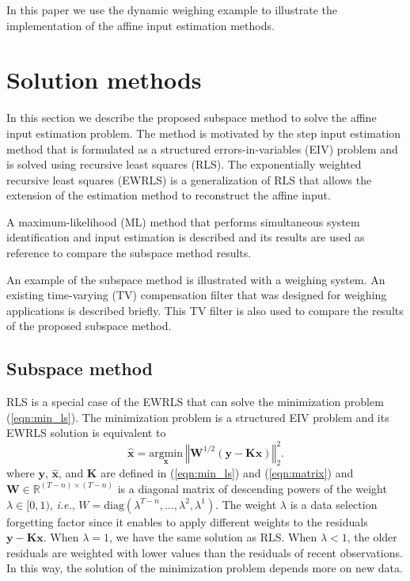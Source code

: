 In this paper we use the dynamic weighing example to illustrate the implementation of the affine input estimation methods.



\section{Solution methods}

In this section we describe the proposed subspace method to solve the affine input estimation problem.
The method is motivated by the step input estimation method that is formulated as a structured errors-in-variables (EIV) problem and is solved using recursive least squares (RLS).
The exponentially weighted recursive least squares (EWRLS) is a generalization of RLS that allows the extension of the estimation method to reconstruct the affine input.

A maximum-likelihood (ML) method that performs simultaneous system identification and input estimation is described and its results are used as reference to compare the subspace method results.

An example of the subspace method is illustrated with a weighing system.
An existing time-varying (TV) compensation filter that was designed for weighing applications is described briefly.
This TV filter is also used to compare the results of the proposed subspace method.


\subsection{Subspace method}

RLS is a special case of the EWRLS that can solve the minimization problem (\ref{eqn:min_ls}).
The minimization problem is a structured EIV problem and its EWRLS solution is equivalent to 
\begin{equation} \widehat{\mathbf{x}} = \underset{\mathbf{x}}{\mathrm{argmin}} \ \left\Vert \mathbf{W}^{1/2} \left( \mathbf{y} - \mathbf{K} \mathbf{x} \right) \right\Vert^2_2 . \label{eqn:min_ewrls} \end{equation}
where $\mathbf{y}$, $\widehat{\mathbf{x}}$, and $\mathbf{K}$ are defined in (\ref{eqn:min_ls}) and (\ref{eqn:matrix}) and
$\mathbf{W} \in \mathbb{R}^{(T-n) \times (T-n)}$ is a diagonal matrix of descending powers of the weight $\lambda \in [0, 1)$, \textit{i.e.}, $W = \mathrm{diag}\left(\lambda^{T-n}, \ldots, \lambda^2, \lambda^1 \right)$.
The weight $\lambda$ is a data selection forgetting factor since it enables to apply different weights to the residuals $\mathbf{y} - \mathbf{K} \mathbf{x}$.
When $\lambda=1$, we have the same solution as RLS.
When $\lambda<1$, the older residuals are weighted with lower values than the residuals of recent observations.
In this way, the solution of the minimization problem depends more on new data. 

